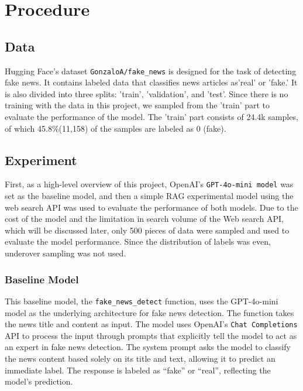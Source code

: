 \documentclass[11pt]{article}
\begin{document}
\section{Procedure}
\subsection{Data}
Hugging Face's dataset \texttt{GonzaloA/fake\_news} is designed for the task of detecting fake news. It contains labeled data that classifies news articles as'real' or 'fake.' It is also divided into three splits: 'train', 'validation', and 'test'. Since there is no training with the data in this project, we sampled from the 'train' part to evaluate the performance of the model. The 'train' part consists of 24.4k samples, of which 45.8\%(11,158) of the samples are labeled as 0 (fake).
\subsection{Experiment}
First, as a high-level overview of this project, OpenAI's \texttt{GPT-4o-mini model} was set as the baseline model, and then a simple RAG experimental model using the web search API was used to evaluate the performance of both models. Due to the cost of the model and the limitation in search volume of the Web search API, which will be discussed later, only 500 pieces of data were sampled and used to evaluate the model performance. Since the distribution of labels was even, under\/over sampling was not used.
\subsubsection{Baseline Model}
This baseline model, the \texttt{fake\_news\_detect} function, uses the GPT-4o-mini model as the underlying architecture for fake news detection. The function takes the news title and content as input. The model uses OpenAI's \texttt{Chat Completions} API to process the input through prompts that explicitly tell the model to act as an expert in fake news detection. The system prompt asks the model to classify the news content based solely on its title and text, allowing it to predict an immediate label. The response is labeled as “fake” or “real”, reflecting the model's prediction.
\end{document}
